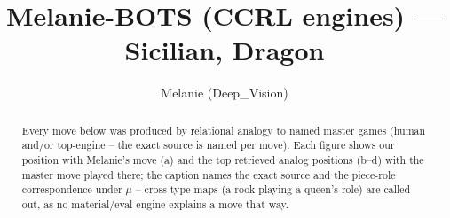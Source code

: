 \documentclass[11pt]{article}
\title{Melanie-BOTS (CCRL engines) — Sicilian, Dragon}
\author{Melanie (Deep\_Vision)}
\date{}
\begin{document}
\maketitle

\begin{abstract}Every move below was produced by relational analogy to named master games (human and/or top-engine -- the exact source is named per move). Each figure shows our position with Melanie's move (a) and the top retrieved analog positions (b--d) with the master move played there; the caption names the exact source and the piece-role correspondence under $\mu$ -- cross-type maps (a rook playing a queen's role) are called out, as no material/eval engine explains a move that way.\end{abstract}

\begin{figure}[p]\centering
\begin{subfigure}{0.46\textwidth}\centering
\resizebox{\linewidth}{!}{%
\newchessgame
\chessboard[
  setfen={rnbqk2r/pp2ppbp/3p1np1/8/3NP3/2N1B3/PPP2PPP/R2QKB1R w KQkq - 2 7},
  showmover=false,
  pgfstyle=straightmove, color=movearrow, markmove={f2-f3}
]}
\caption{}
\end{subfigure}\hfill
\begin{subfigure}{0.46\textwidth}\centering
\resizebox{\linewidth}{!}{%
\newchessgame
\chessboard[
  setfen={rnbqk2r/pp2ppbp/3p1np1/8/3NP3/2N1B3/PPP2PPP/R2QKB1R w KQkq - 2 7},
  showmover=false,
  pgfstyle=straightmove, color=movearrow, markmove={f2-f3}
]}
\caption{}
\end{subfigure}
\\[4pt]
\begin{subfigure}{0.46\textwidth}\centering
\resizebox{\linewidth}{!}{%
\newchessgame
\chessboard[
  setfen={rnbqk2r/pp2ppbp/3p1np1/8/3NP3/2N1B3/PPP2PPP/R2QKB1R w KQkq - 2 7},
  showmover=false,
  pgfstyle=straightmove, color=movearrow, markmove={f2-f3}
]}
\caption{}
\end{subfigure}\hfill
\begin{subfigure}{0.46\textwidth}\centering
\resizebox{\linewidth}{!}{%
\newchessgame
\chessboard[
  setfen={rnbqk2r/pp2ppbp/3p1np1/8/3NP3/2N1B3/PPP2PPP/R2QKB1R w KQkq - 2 7},
  showmover=false,
  pgfstyle=straightmove, color=movearrow, markmove={f2-f3}
]}
\caption{}
\end{subfigure}

\end{figure}
\end{document}
